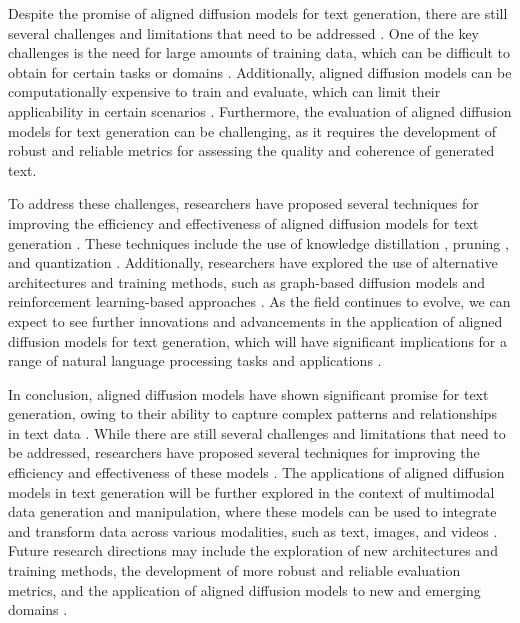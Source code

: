 \documentclass[11pt,a4paper]{article}
\begin{document}
Despite the promise of aligned diffusion models for text generation, there are still several challenges and limitations that need to be addressed \cite{arxiv:2404.07946}. One of the key challenges is the need for large amounts of training data, which can be difficult to obtain for certain tasks or domains \cite{arxiv:2502.06805}. Additionally, aligned diffusion models can be computationally expensive to train and evaluate, which can limit their applicability in certain scenarios \cite{arxiv:2305.10924}. Furthermore, the evaluation of aligned diffusion models for text generation can be challenging, as it requires the development of robust and reliable metrics for assessing the quality and coherence of generated text.

To address these challenges, researchers have proposed several techniques for improving the efficiency and effectiveness of aligned diffusion models for text generation \cite{arxiv:2303.07576}. These techniques include the use of knowledge distillation \cite{arxiv:2502.12146}, pruning \cite{arxiv:2305.10924}, and quantization \cite{arxiv:2502.06805}. Additionally, researchers have explored the use of alternative architectures and training methods, such as graph-based diffusion models \cite{arxiv:2402.16302} and reinforcement learning-based approaches \cite{arxiv:2305.13301}. As the field continues to evolve, we can expect to see further innovations and advancements in the application of aligned diffusion models for text generation, which will have significant implications for a range of natural language processing tasks and applications \cite{arxiv:2303.07576}.

In conclusion, aligned diffusion models have shown significant promise for text generation, owing to their ability to capture complex patterns and relationships in text data \cite{doi:10.1145/3626235}. While there are still several challenges and limitations that need to be addressed, researchers have proposed several techniques for improving the efficiency and effectiveness of these models \cite{arxiv:2502.06805}. The applications of aligned diffusion models in text generation will be further explored in the context of multimodal data generation and manipulation, where these models can be used to integrate and transform data across various modalities, such as text, images, and videos \cite{doi:10.1109/tkde.2024.3361474}. Future research directions may include the exploration of new architectures and training methods, the development of more robust and reliable evaluation metrics, and the application of aligned diffusion models to new and emerging domains \cite{doi:10.1109/tkde.2024.3361474}.
\end{document}
